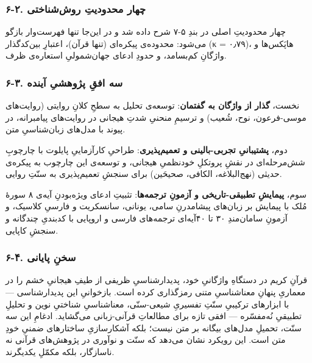 \documentclass[12pt,a4paper]{article}
\begin{document}
\begin{RTL}
\begin{otherlanguage}{persian}
\subsubsection{۶-۲. چهار محدودیتِ
روش‌شناختی}\label{ux686ux647ux627ux631-ux645ux62dux62fux648ux62fux6ccux62a-ux631ux648ux634ux634ux646ux627ux62eux62aux6cc}

چهار محدودیتِ اصلی در بندِ ۵-۷ شرح داده شد و در این‌جا تنها فهرست‌وار بازگو
می‌شود: محدوده‌ی پیکره‌ای (تنها قرآن)، اعتبارِ بین‌کدگذار (κ = ۰٫۷۹)، هاپَکس‌ها
و واژگانِ کم‌بسامد، و حدودِ ادعای جهان‌شمولیِ استعاره‌ی ظرف.

\subsubsection{۶-۳. سه افقِ پژوهشیِ
آینده}\label{ux633ux647-ux627ux641ux642-ux67eux698ux648ux647ux634ux6cc-ux622ux6ccux646ux62fux647}

نخست، \textbf{گذار از واژگان به گفتمان}: توسعه‌ی تحلیل به سطحِ کلانِ روایتی
(روایت‌های موسی-فرعون، نوح، شُعیب) و ترسیمِ منحنیِ شدتِ هیجانی در روایت‌های
پیامبرانه، در پیوند با مدل‌های زبان‌شناسیِ متن.

دوم، \textbf{پشتیبانیِ تجربی-بالینی و تعمیم‌پذیری}: طراحیِ کارآزماییِ پایلوت
با چارچوبِ شش‌مرحله‌ای در نقشِ پروتکلِ خودنظمیِ هیجانی، و توسعه‌ی این چارچوب به
پیکره‌ی حدیثی (نهج‌البلاغه، الکافی، صحیحَین) برای سنجشِ تعمیم‌پذیری به سنّتِ
روایی.

سوم، \textbf{پیمایشِ تطبیقی-تاریخی و آزمونِ ترجمه‌ها}: تثبیتِ ادعای ویژه‌بودنِ
آیه‌ی ۸ سورۀ مُلک با پیمایش بر زبان‌های پیشامدرنِ سامی، یونانی، سانسکریت و
فارسیِ کلاسیک، و آزمونِ سامان‌مندِ ۳۰ تا ۴۰‌آیه‌ای ترجمه‌های فارسی و اروپایی با
کدبندیِ چندگانه و سنجشِ کاپایی.

\subsubsection{۶-۴. سخنِ
پایانی}\label{ux633ux62eux646-ux67eux627ux6ccux627ux646ux6cc}

قرآنِ کریم در دستگاهِ واژگانیِ خود، پدیدارشناسیِ ظریفی از طیفِ هیجانیِ خشم را
در معماریِ پنهانِ معناشناسیِ متنی رمزگذاری کرده است. بازخوانیِ این
پدیدارشناسی --- با ابزارهای ترکیبیِ سنّتِ تفسیریِ شیعی-سنّی، معناشناسیِ شناختیِ
نوین و تحلیلِ تطبیقیِ نُه‌مفسّره --- افقی تازه برای مطالعاتِ قرآنی-زبانی
می‌گشاید. ادغامِ این سه سنّت، تحمیلِ مدل‌های بیگانه بر متن نیست؛ بلکه
آشکارسازیِ ساختارهای ضمنیِ خودِ متن است. این رویکرد نشان می‌دهد که سنّت و
نوآوری در پژوهش‌های قرآنی نه ناسازگار، بلکه مکمّلِ یکدیگرند.


\end{otherlanguage}
\end{RTL}
\end{document}
